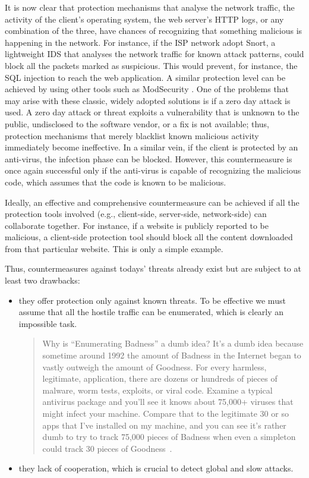 \documentclass[12pt]{article}
\theoremstyle{definition}
\begin{document}
		It is now clear that protection mechanisms that analyse the network
		traffic, the activity of the client's operating system, the web
		server's HTTP logs, or any combination of the three, have chances
		of recognizing that something malicious is happening in the
		network. For instance, if the ISP network adopt \textsf{Snort}, a
		lightweight IDS that analyses the network traffic for known
		attack patterns, could block all the packets marked as
		suspicious. This would prevent, for instance, the SQL injection
		to reach the web application. A similar protection level can be
		achieved by using other tools such as \textsf{ModSecurity}
		. One of the problems that may arise with
		these classic, widely adopted solutions is if a zero day
		attack is used. A zero day attack or threat exploits a vulnerability
		that is unknown to the public, undisclosed to the software vendor, or
		a fix is not available; thus, protection mechanisms that merely
		blacklist known malicious activity immediately become ineffective. In
		a similar vein, if the client is protected by an anti-virus, the
		infection phase can be blocked. However, this countermeasure is once
		again successful only if the anti-virus is capable of recognizing the
		malicious code, which assumes that the code is known to be malicious.
		
		Ideally, an effective and comprehensive countermeasure can be achieved
		if all the protection tools involved (e.g., client-side,
		server-side, network-side) can collaborate together. For
		instance, if a website is publicly reported to be malicious, a
		client-side protection tool should block all the content
		downloaded from that particular website. This is only a simple
		example.
		
		Thus, countermeasures against todays' threats already exist but are
		subject to at least two drawbacks:
		
		\begin{itemize}
			\item they offer protection only against known threats. To be
			effective we must assume that all the hostile traffic can be
			enumerated, which is clearly an impossible task.
			
			\begin{quotation}
				Why is ``Enumerating Badness'' a dumb idea? It's a dumb idea
				because sometime around 1992 the amount of Badness in the Internet
				began to vastly outweigh the amount of Goodness. For every
				harmless, legitimate, application, there are dozens or hundreds of
				pieces of malware, worm tests, exploits, or viral code. Examine a
				typical antivirus package and you'll see it knows about 75,000+
				viruses that might infect your machine. Compare that to the
				legitimate 30 or so apps that I've installed on my machine, and
				you can see it's rather dumb to try to track 75,000 pieces of
				Badness when even a simpleton could track 30 pieces of
				Goodness~\citep{ranum-myths}.
			\end{quotation}
			
			\item they lack of cooperation, which is crucial to detect global and
			slow attacks.
		\end{itemize}
		
\end{document}
